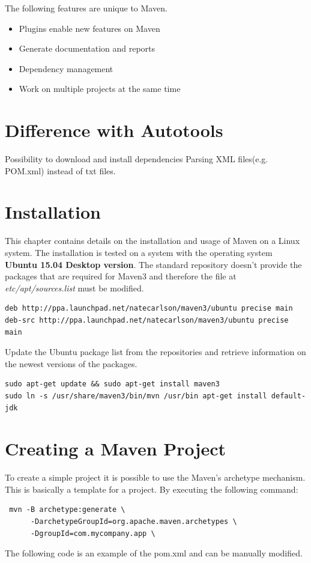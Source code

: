 The following features are unique to Maven.
\begin{itemize}
	\item Plugins enable new features on Maven
	\item Generate documentation and reports
	\item Dependency management
	\item Work on multiple projects at the same time
\end{itemize}

\section{Difference with Autotools}
Possibility to download and install dependencies Parsing XML files(e.g. POM.xml) instead of txt files. 

\section{Installation}
This chapter contains details on the installation and usage of Maven on a Linux system. The installation is tested on a system with the operating system \textbf{Ubuntu 15.04 Desktop version}.
The standard repository doesn't provide the packages that are required for Maven3 and therefore the file at \mbox{\textit{etc/apt/sources.list}} must be modified.

\begin{verbatim}
deb http://ppa.launchpad.net/natecarlson/maven3/ubuntu precise main
deb-src http://ppa.launchpad.net/natecarlson/maven3/ubuntu precise main
\end{verbatim}

Update the Ubuntu package list from the repositories and retrieve information on the newest versions of the packages.

\begin{verbatim}
sudo apt-get update && sudo apt-get install maven3 
sudo ln -s /usr/share/maven3/bin/mvn /usr/bin apt-get install default-jdk
\end{verbatim}

\section{Creating a Maven Project}
To create a simple project it is possible to use the Maven's archetype mechanism. This is basically a template for a project. By executing the following command: 
\begin{verbatim}
 mvn -B archetype:generate \
      -DarchetypeGroupId=org.apache.maven.archetypes \
      -DgroupId=com.mycompany.app \
\end{verbatim}
The following code is an example of the pom.xml and can be manually modified.

